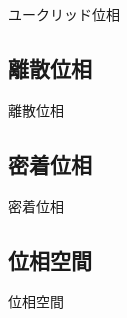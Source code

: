 ユークリッド位相

\newpage


\subsection{離散位相}

離散位相

\newpage


\subsection{密着位相}

密着位相

\newpage


\subsection{位相空間}

位相空間

\newpage
